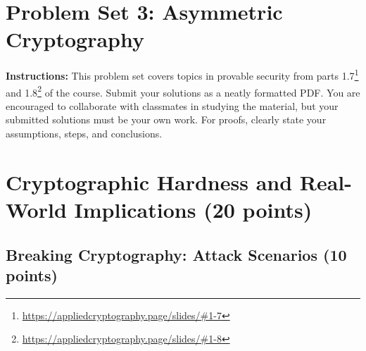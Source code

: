 \documentclass[10pt,a4paper,american]{article}
\begin{document}
\classhandoutheader

\section*{Problem Set 3: Asymmetric Cryptography}

\begin{tcolorbox}[colframe=OliveGreen!30!white,colback=OliveGreen!5!white]
	\textbf{Instructions:} This problem set covers topics in provable security from parts 1.7\footnote{\url{https://appliedcryptography.page/slides/\#1-7}} and 1.8\footnote{\url{https://appliedcryptography.page/slides/\#1-8}} of the course. Submit your solutions as a neatly formatted PDF. You are encouraged to collaborate with classmates in studying the material, but your submitted solutions must be your own work. For proofs, clearly state your assumptions, steps, and conclusions.
\end{tcolorbox}

\section{Cryptographic Hardness and Real-World Implications (20 points)}

\subsection{Breaking Cryptography: Attack Scenarios (10 points)}
\end{document}

